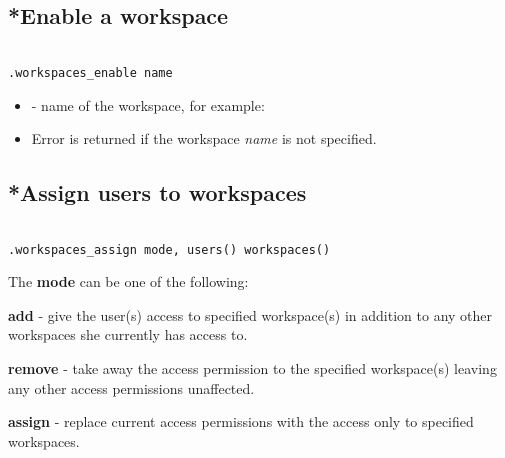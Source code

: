 \subsection{*Enable a workspace}

\begin{lstlisting}[style=CommandLineStyle, showlines=true]

.workspaces_enable name

\end{lstlisting}

\paramsheader
\begin{itemize}

    \item {} - name of the workspace, for example:

\end{itemize}

\errheader
\begin{itemize}
    \item Error  is returned if the workspace \textit{name} is
    not specified.
\end{itemize}


\subsection{*Assign users to workspaces}

\begin{lstlisting}[style=CommandLineStyle, showlines=true]

.workspaces_assign mode, users() workspaces()

\end{lstlisting}

\vskip10pt
The \textbf{mode} can be one of the following:
\vskip10pt
\begin{compactitem}
  \item \textbf{add} - give the user(s) access to specified workspace(s)
                  in addition to any other workspaces she currently
                  has access to.
  \item \textbf{remove} - take away the access permission to the specified
                  workspace(s) leaving any other access permissions
                  unaffected.
  \item \textbf{assign} - replace current access permissions with the
                  access only to specified workspaces.
\end{compactitem}

\optsheader

